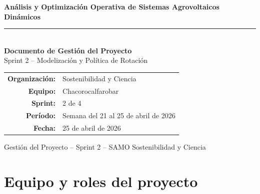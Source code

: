 \documentclass[12pt,a4paper]{article}
\begin{document}
\begin{titlepage}
\centering
\vspace*{1cm}
{\LARGE \textbf{Análisis y Optimización Operativa de Sistemas Agrovoltaicos Dinámicos}}\\[1cm]
\rule{14cm}{0.6pt}\\[0.6cm]
{\Large \textbf{Documento de Gestión del Proyecto}}\\[0.3cm]
{\large Sprint 2 -- Modelización y Política de Rotación}\\[1.5cm]

\begin{tabular}{rl}
\textbf{Organización:} & Sostenibilidad y Ciencia \\[6pt]
\textbf{Equipo:}       & Chacorocalfarobar \\[6pt]
\textbf{Sprint:}       & 2 de 4 \\[6pt]
\textbf{Período:}      & Semana del 21 al 25 de abril de 2026 \\[6pt]
\textbf{Fecha:}        & 25 de abril de 2026 \\
\end{tabular}

\vfill
{\small Gestión del Proyecto -- Sprint 2 -- SAMO \hfill Sostenibilidad y Ciencia}
\end{titlepage}

\newpage
\tableofcontents

\newpage
\section{Equipo y roles del proyecto}
\end{document}

